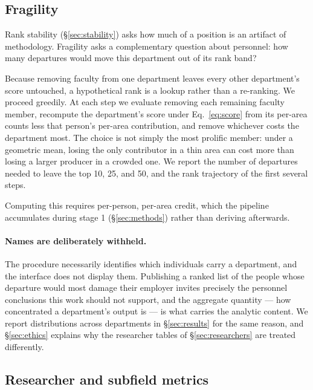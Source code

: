 \documentclass[11pt]{article}
\begin{document}
\subsection{Fragility}
\label{sec:fragility}

Rank stability (\S\ref{sec:stability}) asks how much of a position is an
artifact of methodology. Fragility asks a complementary question about
personnel: how many departures would move this department out of its rank band?

Because removing faculty from one department leaves every other department's
score untouched, a hypothetical rank is a lookup rather than a re-ranking. We
proceed greedily. At each step we evaluate removing each remaining faculty
member, recompute the department's score under Eq.~\ref{eq:score} from its
per-area counts less that person's per-area contribution, and remove whichever
costs the department most. The choice is not simply the most prolific member:
under a geometric mean, losing the only contributor in a thin area can cost more
than losing a larger producer in a crowded one. We report the number of
departures needed to leave the top 10, 25, and 50, and the rank trajectory of
the first several steps.

Computing this requires per-person, per-area credit, which the pipeline
accumulates during stage 1 (\S\ref{sec:methods}) rather than deriving
afterwards.

\paragraph{Names are deliberately withheld.} The procedure necessarily
identifies which individuals carry a department, and the interface does not
display them. Publishing a ranked list of the people whose departure would most
damage their employer invites precisely the personnel conclusions this work
should not support, and the aggregate quantity --- how concentrated a
department's output is --- is what carries the analytic content. We report
distributions across departments in \S\ref{sec:results} for the same reason,
and \S\ref{sec:ethics} explains why the researcher tables of
\S\ref{sec:researchers} are treated differently.

\subsection{Researcher and subfield metrics}
\label{sec:researchermethod}
\end{document}
